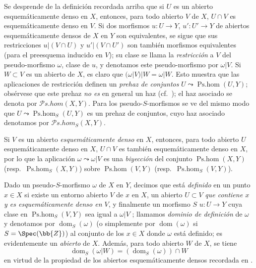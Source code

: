 \begin{env}[20.2.2]
\label{IV.20.2.2}
Se desprende de la definición recordada arriba que si $U$ es un abierto esquemáticamente denso en $X$, entonces, para todo abierto $V$ de $X$, $U\cap V$ es esquemáticamente denso en $V$.
Si dos morfismos $u:U\to Y$, $u':U'\to Y$ de abiertos esquemáticamente densos de $X$ en $Y$ son equivalentes, se sigue que sus restricciones $u|(V\cap U)$ y $u'|(V\cap U')$ son también morfismos equivalentes (para el preesquema inducido en $V$); su clase se llama la \emph{restricción} a $V$ del pseudo-morfismo $\omega$, clase de $u$, y denotamos este pseudo-morfismo por $\omega|V$.
Si $W\subset V$ es un abierto de $X$, es claro que $(\omega|V)|W=\omega|W$.
Esto muestra que las aplicaciones de restricción definen un \emph{prehaz de conjuntos} $U\leadsto\operatorname{Ps.hom}(U,Y)$; obsérvese que este prehaz \emph{no es} en general un haz (cf.\ ); el haz asociado se denota por $\mathscr{P}\!s.\!\mathit{hom}(X,Y)$.
Para los pseudo-$S$-morfismos se ve del mismo modo que $U\leadsto\operatorname{Ps.hom}_S(U,Y)$ es un prehaz de conjuntos, cuyo haz asociado denotamos por $\mathscr{P}\!s.\!\mathit{hom}_S(X,Y)$.

Si $V$ es un abierto \emph{esquemáticamente denso} en $X$, entonces, para todo abierto $U$ esquemáticamente denso en $X$, $U\cap V$ es también esquemáticamente denso en $X$, por lo que la aplicación $\omega\leadsto\omega|V$ es una \emph{biyección} del conjunto $\operatorname{Ps.hom}(X,Y)$ (resp.\ $\operatorname{Ps.hom}_S(X,Y)$) sobre $\operatorname{Ps.hom}(V,Y)$ (resp.\ $\operatorname{Ps.hom}_S(V,Y)$).
\end{env}

\begin{env}[20.2.3]
\label{IV.20.2.3}
Dado un pseudo-$S$-morfismo $\omega$ de $X$ en $Y$, decimos que está \emph{definido} en un punto $x\in X$ si existe un entorno abierto $V$ de $x$ en $X$, un abierto $U\subset V$ \emph{que contiene $x$ y es esquemáticamente denso en $V$}, y finalmente un morfismo $S$ $u:U\to Y$ cuya clase en $\operatorname{Ps.hom}_S(V,Y)$ sea igual a $\omega|V$ ; llamamos \emph{dominio de definición} de $\omega$ y denotamos por $\operatorname{dom}_S(\omega)$ (o simplemente por $\operatorname{dom}(\omega)$ si $S=\Spec(\bb{Z})$) al conjunto de los $x\in X$ donde $\omega$ está definido; es evidentemente un \emph{abierto} de $X$.
Además, para todo abierto $W$ de $X$, se tiene
\[
\label{IV.20.2.3.1}
  \operatorname{dom}_S(\omega|W)=(\operatorname{dom}_S(\omega))\cap W
  \tag{20.2.3.1}
\]
en virtud de la propiedad de los abiertos esquemáticamente densos recordada en .
\end{env}

